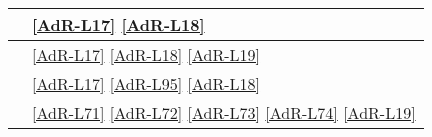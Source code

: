 \begin{longtable}{|m{12cm}|>{\centering}m{2cm}|}
	\hline \coderef{ToDoList::Model::ItemsStore} & \ref{AdR-L17} \linebreak \ref{AdR-L18} \tabularnewline
	\hline \coderef{ToDoList::Model::ListItem} & \ref{AdR-L17} \linebreak \ref{AdR-L18} \linebreak \ref{AdR-L19} \tabularnewline
	\hline \coderef{ToDoList::Controller::ListItemController} & \ref{AdR-L17} \linebreak \ref{AdR-L95} \linebreak \ref{AdR-L18}  \tabularnewline
	\hline \coderef{ToDoList::View::ListItemView} & \ref{AdR-L71} \linebreak \ref{AdR-L72} \linebreak \ref{AdR-L73}  \linebreak \ref{AdR-L74}  \linebreak \ref{AdR-L19} \tabularnewline
	

\end{longtable}
